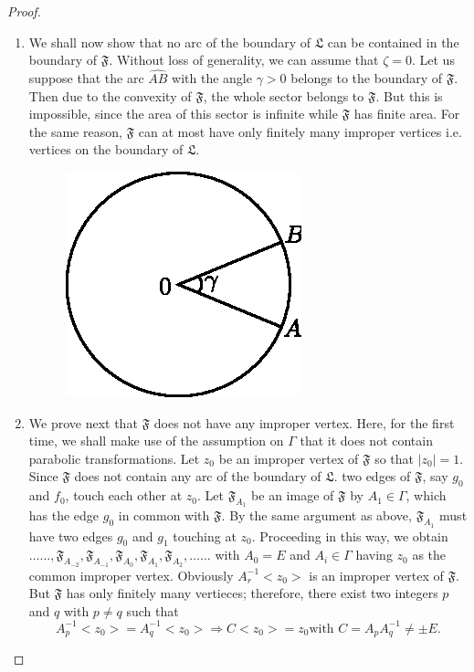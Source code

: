 \begin{proof}
\begin{enumerate}
\item We shall now show that no arc of the boundary of $\mathfrak{L}$
  can be contained in the boundary of $\mathfrak{F}$. Without loss of
  generality, we can assume that $\zeta=0$. Let us suppose that the
  arc $\widehat{AB}$ with the angle $\gamma>0$ belongs to the boundary
  of $\mathfrak{F}$. Then due to the convexity of $\mathfrak{F}$, the
  whole sector belongs to $\mathfrak{F}$. But this is impossible,
  since the area of this sector is infinite while $\mathfrak{F}$ has
  finite area. For the same reason, $\mathfrak{F}$ can at most have
  only finitely many improper vertices i.e. vertices on the boundary
  of $\mathfrak{L}$.

\begin{figure}[H]
\centering
\includegraphics{vol29-fig/fig29-8.eps}
\smallskip
\caption{}
\label{chap1:fig8}
\end{figure}

\item We prove next that $\mathfrak{F}$ does not have any improper
  vertex. Here, for the first time, we shall make use of the
  assumption on $\Gamma$ that it does not contain parabolic
  transformations. Let $z_0$ be an improper vertex of $\mathfrak{F}$
  so that $|z_0|=1$. Since $\mathfrak{F}$ does not contain any arc of
  the boundary of $\mathfrak{L}$. two edges of $\mathfrak{F}$, say
  $g_0$ and $f_0$, touch each other at $z_0$. Let $\mathfrak{F}_{A_1}$
  be an image of $\mathfrak{F}$ by $A_1 \in \Gamma$, which has
  the edge $g_0$ in common with $\mathfrak{F}$. By the same argument
  as above, $\mathfrak{F}_{A_1}$ must have two edges $g_0$ and $g_1$
  touching at $z_0$. Proceeding in this way, we obtain $\ldots \ldots,
  \mathfrak{F}_{A_{-2}}, \mathfrak{F}_{A_{-1}}, \mathfrak{F}_{A_0},
  \mathfrak{F}_{A_1}, \mathfrak{F}_{A_2}, \ldots \ldots $ with $A_0=E$
  and $A_i \in \Gamma$ having $z_0$ as the common improper
  vertex. Obviously $A^{-1}_r<z_0>$ is an improper vertex of
  $\mathfrak{F}$. But $\mathfrak{F}$ has only finitely \pageoriginale
  many vertieces; therefore, there exist two integers $p$ and $q$
  with $p \neq q$ such that 
{\fontsize{10}{12}\selectfont
$$
A^{-1}_p <z_0> = A^{-1}_q <z_0> \Longrightarrow C<z_0> = z_0 \text{
  with } C = A_p A^{-1}_q \neq \pm E.
$$}\relax


\end{enumerate}
\end{proof}

